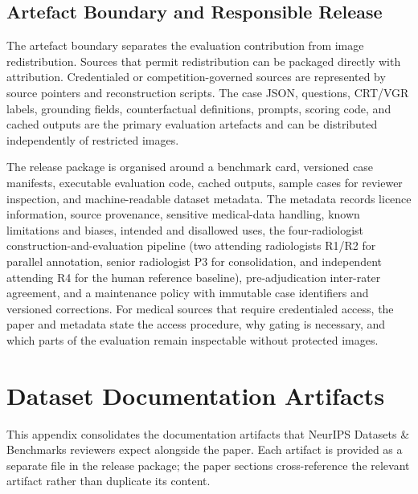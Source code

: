\documentclass{article}
\begin{document}
\subsection{Artefact Boundary and Responsible Release}

The artefact boundary separates the evaluation contribution from image redistribution. Sources that permit redistribution can be packaged directly with attribution. Credentialed or competition-governed sources are represented by source pointers and reconstruction scripts. The case JSON, questions, CRT/VGR labels, grounding fields, counterfactual definitions, prompts, scoring code, and cached outputs are the primary evaluation artefacts and can be distributed independently of restricted images.

The release package is organised around a benchmark card, versioned case manifests, executable evaluation code, cached outputs, sample cases for reviewer inspection, and machine-readable dataset metadata. The metadata records licence information, source provenance, sensitive medical-data handling, known limitations and biases, intended and disallowed uses, the four-radiologist construction-and-evaluation pipeline (two attending radiologists \textsc{R1}/\textsc{R2} for parallel annotation, senior radiologist \textsc{P3} for consolidation, and independent attending \textsc{R4} for the human reference baseline), pre-adjudication inter-rater agreement, and a maintenance policy with immutable case identifiers and versioned corrections. For medical sources that require credentialed access, the paper and metadata state the access procedure, why gating is necessary, and which parts of the evaluation remain inspectable without protected images.

\section{Dataset Documentation Artifacts}
\label{app:documentation}

This appendix consolidates the documentation artifacts that NeurIPS Datasets \& Benchmarks reviewers expect alongside the paper. Each artifact is provided as a separate file in the release package; the paper sections cross-reference the relevant artifact rather than duplicate its content.
\end{document}
